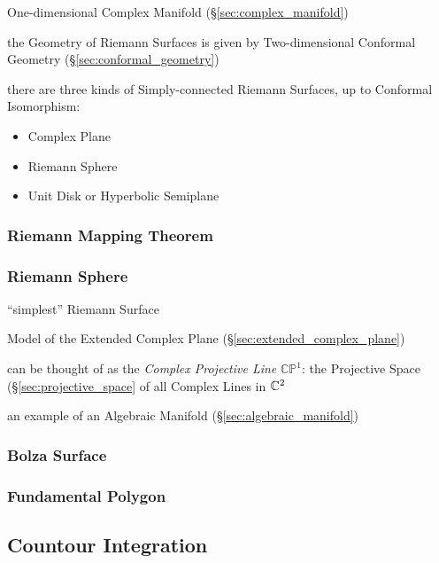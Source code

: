 One-dimensional Complex Manifold (\S\ref{sec:complex_manifold})

the Geometry of Riemann Surfaces is given by Two-dimensional Conformal
Geometry (\S\ref{sec:conformal_geometry})

there are three kinds of Simply-connected Riemann Surfaces, up to Conformal
Isomorphism:
\begin{itemize}
  \item Complex Plane
  \item Riemann Sphere
  \item Unit Disk or Hyperbolic Semiplane
\end{itemize}



\subsubsection{Riemann Mapping Theorem}
\label{sec:riemann_mapping_theorem}

\subsubsection{Riemann Sphere}\label{sec:riemann_sphere}

``simplest'' Riemann Surface

Model of the Extended Complex Plane
(\S\ref{sec:extended_complex_plane})

can be thought of as the \emph{Complex Projective Line}
$\mathbb{CP}^1$: the Projective Space (\S\ref{sec:projective_space} of
all Complex Lines in $\mathbb{C}^2$

an example of an Algebraic Manifold (\S\ref{sec:algebraic_manifold})



\subsubsection{Bolza Surface}\label{sec:bolza_surface}

\subsubsection{Fundamental Polygon}\label{sec:fundamental_polygon}



\subsection{Countour Integration}\label{sec:contour_integration}

